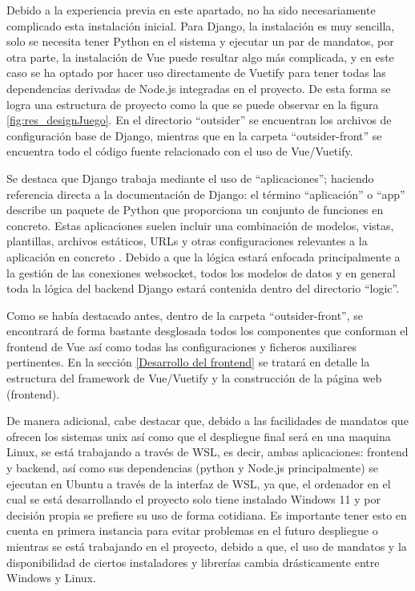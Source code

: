 Debido a la experiencia previa en este apartado, no ha sido necesariamente complicado esta instalación inicial. Para Django,
la instalación es muy sencilla, solo se necesita tener Python en el sistema y ejecutar un par de mandatos, por otra parte,
la instalación de Vue puede resultar algo más complicada, y en este caso se ha optado por hacer uso directamente de Vuetify para
tener todas las dependencias derivadas de Node.js integradas en el proyecto. De esta forma se logra una estructura de proyecto
como la que se puede observar en la figura \ref{fig:res_designJuego}. En el directorio ``outsider'' se encuentran los archivos 
de configuración base de Django, mientras que en la carpeta ``outsider-front'' se encuentra todo el código fuente relacionado 
con el uso de Vue/Vuetify. 

Se destaca que Django trabaja mediante el uso de ``aplicaciones''; haciendo referencia directa a la documentación de Django:
el término ``aplicación'' o ``app'' describe un paquete de Python que proporciona un conjunto de funciones en concreto. 
Estas aplicaciones suelen incluir una combinación de modelos, vistas, 
plantillas, archivos estáticos, URLs y otras configuraciones relevantes a la aplicación en concreto \cite{django}. Debido a que 
la lógica estará enfocada principalmente a la gestión de las conexiones websocket, todos los modelos de datos y en general toda 
la lógica del backend Django estará contenida dentro del directorio ``logic''.

Como se había destacado antes, dentro de la carpeta ``outsider-front'', se encontrará de forma bastante desglosada todos los componentes
que conforman el frontend de Vue así como todas las configuraciones y ficheros auxiliares pertinentes. En la sección \ref{Desarrollo del frontend}
se tratará en detalle la estructura del framework de Vue/Vuetify y la construcción de la página web (frontend).

De manera adicional, cabe destacar que, debido a las facilidades de mandatos que ofrecen los sistemas unix así como que el despliegue
final será en una maquina Linux, se está trabajando a través de WSL, es decir,
ambas aplicaciones: frontend y backend, así como sus dependencias (python y Node.js principalmente) se ejecutan en Ubuntu a través de la interfaz
de WSL, ya que, el ordenador en el cual se está desarrollando el proyecto solo tiene instalado Windows 11 y por decisión propia se prefiere su uso de forma
cotidiana. Es importante tener esto en cuenta en primera instancia para evitar problemas en el futuro despliegue o mientras se está trabajando en el proyecto,
debido a que, el uso de mandatos y la disponibilidad de ciertos instaladores y librerías cambia drásticamente entre Windows y Linux.

